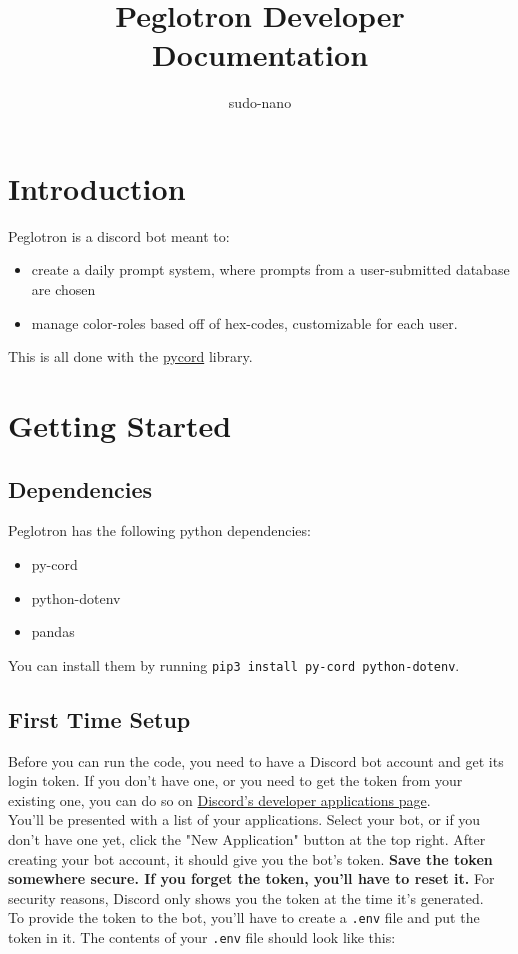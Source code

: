 \documentclass{article}
\title{Peglotron Developer Documentation}
\author{sudo-nano}
\begin{document}
\maketitle

\tableofcontents

\section{Introduction}
Peglotron is a discord bot meant to: 

\begin{itemize}
	\item create a daily prompt system, where prompts from a user-submitted database are chosen
	\item manage color-roles based off of hex-codes, customizable for each user. 
\end{itemize}

This is all done with the \href{https://guide.pycord.dev/}{pycord} library. 


\section{Getting Started}

\subsection{Dependencies}
Peglotron has the following python dependencies:
\begin{itemize}
	\item py-cord
	\item python-dotenv
	\item pandas
\end{itemize}

You can install them by running \verb|pip3 install py-cord python-dotenv|. 

\subsection{First Time Setup}
Before you can run the code, you need to have a Discord bot account and get its login token. If you don't have one, or you need to get the token from your existing one, you can do so on \href{https://discord.com/developers/applications/me}{Discord's developer applications page}. \\

You'll be presented with a list of your applications. Select your bot, or if you don't have one yet, click the "New Application" button at the top right. After creating your bot account, it should give you the bot's token. \textbf{Save the token somewhere secure. If you forget the token, you'll have to reset it.} For security reasons, Discord only shows you the token at the time it's generated. \\

To provide the token to the bot, you'll have to create a \verb|.env| file and put the token in it. The contents of your \verb|.env| file should look like this: 
\end{document}

